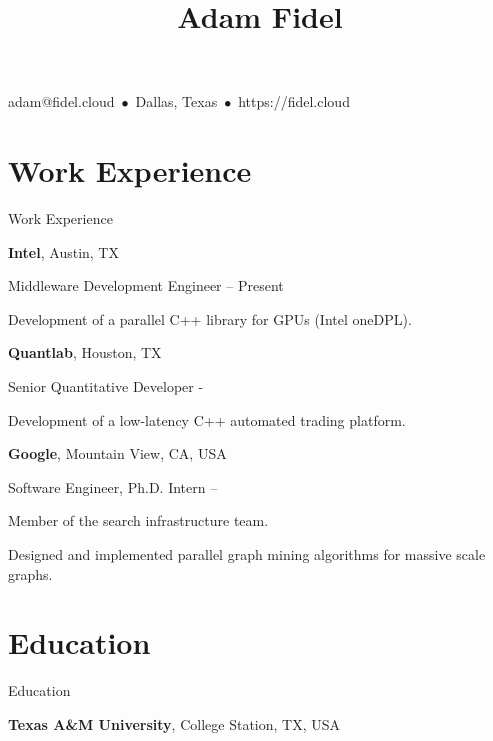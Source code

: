 \documentclass[a4paper,10pt,oneside]{article}
\begin{document}

\title{Adam Fidel}

\begin{subtitle}
\par
adam@fidel.cloud
\,$\bullet$\,
Dallas, Texas
\,$\bullet$\,
https://fidel.cloud
\end{subtitle}

\begin{body}



\section{Work Experience}
{Work Experience}

\textbf{Intel},
Austin, TX
\par
Middleware Development Engineer
\hfill
{} --
Present
\begin{detail}
  Development of a parallel C++ library for GPUs (Intel oneDPL).
\par
\end{detail}
\EntryGap

\textbf{Quantlab},
Houston, TX
\par
Senior Quantitative Developer
\hfill
{} -
\begin{detail}
Development of a low-latency C++ automated trading platform.
\par
\end{detail}
\EntryGap

\textbf{Google},
Mountain View, CA, USA
\par
Software Engineer, Ph.D. Intern
\hfill
{} --
\begin{detail}
Member of the search infrastructure team.
\par
 Designed and implemented parallel graph mining algorithms for massive scale graphs.
 \par
\end{detail}

\section{Education}
{Education}

\textbf{Texas A\&M University},
College Station, TX, USA


\end{body}
\end{document}
